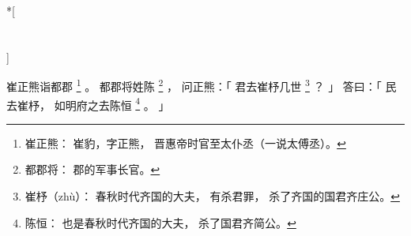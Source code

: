 
\switchcolumn[0]*[\section{}]

崔正熊诣都郡%
\footnote{%
    崔正熊：
        崔豹，字正熊，
        晋惠帝时官至太仆丞（一说太傅丞）。
}%
。
都郡将姓陈%
\footnote{%
    都郡将：
        郡的军事长官。
}%
，
问正熊：「
    君去崔杼几世%
    \footnote{%
        崔杼（zhù）：
            春秋时代齐国的大夫，
            有杀君罪，
            杀了齐国的国君齐庄公。
    }%
    ？
」
答曰：「
    民去崔杼，
    如明府之去陈恒%
    \footnote{%
        陈恒：
            也是春秋时代齐国的大夫，
            杀了国君齐简公。
    }%
    。
」

\switchcolumn


